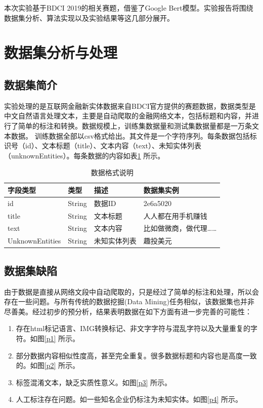 \documentclass[11pt]{article}
\begin{document}
本次实验基于BDCI 2019的相关赛题，借鉴了Google Bert模型。实验报告将围绕数据集分析、算法实现以及实验结果等这几部分展开。

\section{数据集分析与处理}
\subsection{数据集简介}
实验处理的是互联网金融新实体数据来自BDCI官方提供的赛题数据，数据类型是中文自然语言处理文本，主要是自动爬取的金融网络文本，包括标题和内容，并进行了简单的标注和转换。数据规模上，训练集数据量和测试集数据量都是一万条文本数据。%
训练数据全部以csv格式给出。其文件是一个字符序列。每条数据包括标识号（id）、文本标题（title）、文本内容（text）、未知实体列表（unknownEntities）。每条数据的内容如表\ref{data_description} 所示。
%
\tabcolsep=12pt
\begin{table}[!ht]
    \centering
    \begin{tabular}{llll}
        \toprule
        字段类型 & 类型 & 描述 & 数据集实例\\ \midrule
        id & String & 数据ID & 2e6a5020 \\
        title & String & 文本标题 & 人人都在用手机赚钱\\
        text & String & 文本内容 & 比如做微商，做代理……\\
        UnknownEntities & String & 未知实体列表 & 趣投美元 \\ 
        \bottomrule
    \end{tabular}
    \caption{数据格式说明}
    \label{data_description}
\end{table}

\subsection{数据集缺陷}
由于数据是直接从网络文段中自动爬取的，只是经过了简单的标注和处理，所以会存在一些问题。与所有传统的数据挖掘(Data Mining)任务相似，该数据集也并非尽善美。经过初步的预分析，结果表明数据在如下方面有进一步完善的可能性：
\begin{enumerate}[label=(\roman*)]
    \item 存在html标记语言、IMG转换标记、非文字字符与混乱字符以及大量重复的字符。如图\ref{p1} 所示。
    \item 部分数据内容相似性度高，甚至完全重复。很多数据标题和内容也是高度一致的。如图\ref{p2} 所示。
    \item 标签混淆文本，缺乏实质性意义。如图\ref{p3} 所示。
    \item 人工标注存在问题。如一些知名企业仍标注为未知实体。如图\ref{p4} 所示。
\end{enumerate}
\end{document}
